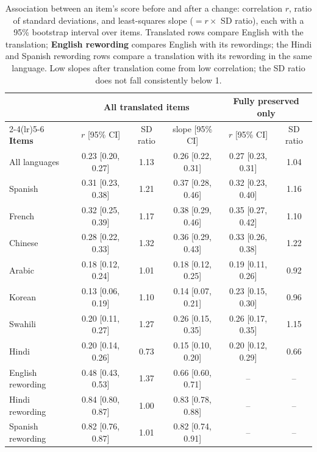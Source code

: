 \begin{table}[t]
\centering
\small
\setlength{\tabcolsep}{4pt}
\begin{tabular}{lccccc}
\toprule
 & \multicolumn{3}{c}{\textbf{All translated items}} & \multicolumn{2}{c}{\textbf{Fully preserved only}} \\
\cmidrule(lr){2-4}\cmidrule(lr){5-6}
\textbf{Items} & $r$ [95\% CI] & SD ratio & slope [95\% CI] & $r$ [95\% CI] & SD ratio \\
\midrule
All languages & 0.23 [0.20, 0.27] & 1.13 & 0.26 [0.22, 0.31] & 0.27 [0.23, 0.31] & 1.04 \\
\midrule
Spanish & 0.31 [0.23, 0.38] & 1.21 & 0.37 [0.28, 0.46] & 0.32 [0.23, 0.40] & 1.16 \\
French & 0.32 [0.25, 0.39] & 1.17 & 0.38 [0.29, 0.46] & 0.35 [0.27, 0.42] & 1.10 \\
Chinese & 0.28 [0.22, 0.33] & 1.32 & 0.36 [0.29, 0.43] & 0.33 [0.26, 0.38] & 1.22 \\
Arabic & 0.18 [0.12, 0.24] & 1.01 & 0.18 [0.12, 0.25] & 0.19 [0.11, 0.26] & 0.92 \\
Korean & 0.13 [0.06, 0.19] & 1.10 & 0.14 [0.07, 0.21] & 0.23 [0.15, 0.30] & 0.96 \\
Swahili & 0.20 [0.11, 0.27] & 1.27 & 0.26 [0.15, 0.35] & 0.26 [0.17, 0.35] & 1.15 \\
Hindi & 0.20 [0.14, 0.26] & 0.73 & 0.15 [0.10, 0.20] & 0.20 [0.12, 0.29] & 0.66 \\
\midrule
English rewording & 0.48 [0.43, 0.53] & 1.37 & 0.66 [0.60, 0.71] & -- & -- \\
Hindi rewording & 0.84 [0.80, 0.87] & 1.00 & 0.83 [0.78, 0.88] & -- & -- \\
Spanish rewording & 0.82 [0.76, 0.87] & 1.01 & 0.82 [0.74, 0.91] & -- & -- \\
\bottomrule
\end{tabular}
\caption{Association between an item's score before and after a change: correlation $r$, ratio of standard deviations, and least-squares slope ($= r \times$ SD ratio), each with a 95\% bootstrap interval over items. Translated rows compare English with the translation; \textbf{English rewording} compares English with its rewordings; the Hindi and Spanish rewording rows compare a translation with its rewording in the same language. Low slopes after translation come from low correlation; the SD ratio does not fall consistently below 1.}
\label{tab:assoc}
\end{table}
